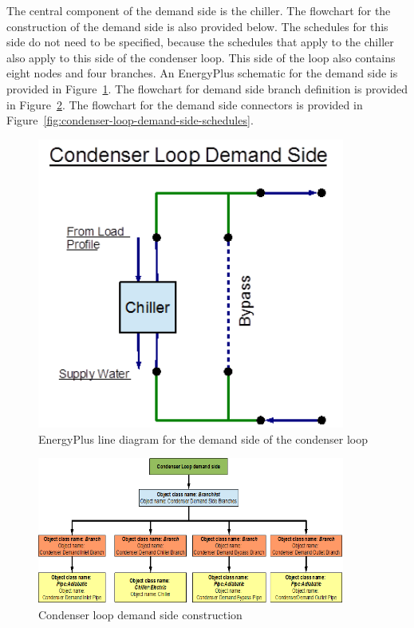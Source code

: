 The central component of the demand side is the chiller. The flowchart for the construction of the demand side is also provided below. The schedules for this side do not need to be specified, because the schedules that apply to the chiller also apply to this side of the condenser loop. This side of the loop also contains eight nodes and four branches. An EnergyPlus schematic for the demand side is provided in Figure~\ref{fig:energyplus-line-diagram-for-the-demand-side-2016-06-17}. The flowchart for demand side branch definition is provided in Figure~\ref{fig:condenser-loop-demand-side-construction}. The flowchart for the demand side connectors is provided in Figure~\ref{fig:condenser-loop-demand-side-schedules}.

\begin{figure}[hbtp] %
\centering
\includegraphics[width=0.9\textwidth, height=0.9\textheight, keepaspectratio=true]{media/image034.png}
\caption{EnergyPlus line diagram for the demand side of the condenser loop \protect \label{fig:energyplus-line-diagram-for-the-demand-side-2016-06-17}}
\end{figure}

\begin{figure}[hbtp] %
\centering
\includegraphics[width=0.9\textwidth, height=0.9\textheight, keepaspectratio=true]{media/image035.png}
\caption{Condenser loop demand side construction \protect \label{fig:condenser-loop-demand-side-construction}}
\end{figure}

